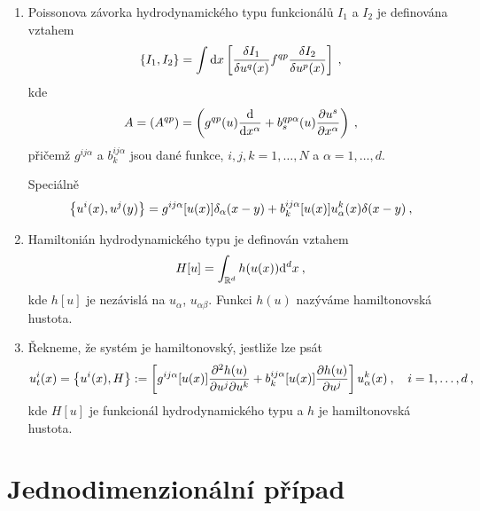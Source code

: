 \begin{definition}
    \begin{enumerate}
        \item Poissonova závorka hydrodynamického typu funkcionálů $I_1$ a $I_2$ je definována vztahem
        \begin{align}
            \left \lbrace I_1,I_2 \right \rbrace = \int \mathrm{d} x 
            \left[ \frac{\delta I_1}{\delta u^q(x)} f^{qp} \frac{\delta I_2}{\delta u^p(x)} \right] \:,
        \end{align}
        kde 
        \begin{align}
            A = (A^{qp}) = \left( g^{qp}(u) \frac{\mathrm{d}}{\mathrm{d}x^\alpha} + b^{qp\alpha}_s(u) \frac{\partial u^s}{\partial x^\alpha} \right) \:,
        \end{align}
        přičemž $g^{ij \alpha}$ a $b_k^{ij \alpha}$ jsou dané funkce, $i,j,k = 1, \dots, N$ a $\alpha = 1, \dots, d $.

        Speciálně
        \begin{align}
            \left \lbrace u^i(x), u^j(y) \right \rbrace = g^{ij \alpha} [u(x)] \delta_\alpha(x-y) + b_k^{ij \alpha} [u(x)] u_\alpha^k(x) \delta(x-y) \:,
        \end{align}
        

        \item Hamiltonián hydrodynamického typu je definován vztahem
        \begin{align}
            H[u] = \int_{\mathbb{R}^d} h(u(x)) \mathrm{d}^d x \:,
        \end{align}
        kde $h[u]$ je nezávislá na $u_\alpha$, $u_{\alpha \beta}$. Funkci $h(u)$ nazýváme hamiltonovská hustota.

        \item Řekneme, že systém je hamiltonovský, jestliže lze psát
        \begin{align}
            u^i_t (x) = \left \lbrace u^i(x), H \right \rbrace := 
            \left[ g^{ij \alpha} [u(x)] \frac{\partial^2 h(u)}{\partial u^j \partial u^k} + b_k^{ij \alpha} [u(x)] \frac{\partial h(u)}{\partial u^j} \right] u_\alpha^k(x) \:, \quad i = 1, \dots , d \:,
        \end{align}
        kde $H[u]$ je funkcionál hydrodynamického typu a $h$ je hamiltonovská hustota.
    \end{enumerate}
\end{definition}

\section{Jednodimenzionální případ}


